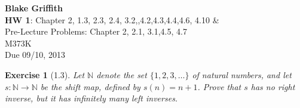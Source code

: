 \documentclass[12pt,leqno]{article}
\numberwithin{equation}{section}
\newtheorem*{exer}{Exercise}
\theoremstyle{definition}
\begin{document}
\thispagestyle{plain}
\begin{flushright}
\large{\textbf{Blake Griffith \\}
\textbf{HW 1}: Chapter 2, 1.3, 2.3, 2.4, 3.2,,4.2,4.3,4.4,4.6, 4.10 \& \\
Pre-Lecture Problems: Chapter 2, 2.1, 3.1,4.5, 4.7\\
M373K \\
Due 09/10, 2013 \\}
\end{flushright}

\markboth{}{} \setcounter{section}{0} \baselineskip=18pt

\setcounter{tocdepth}{4}




\begin{exer}[1.3]
Let $\mathbb N $ denote the set $\{1,2,3,\ldots \}$ of natural numbers, and let $s: \mathbb N \rightarrow \mathbb N$ be the shift map, defined by $s(n)=n+1$. Prove that $s$ has no right inverse, but it has infinitely many left inverses. 
\end{exer}
\end{document}
